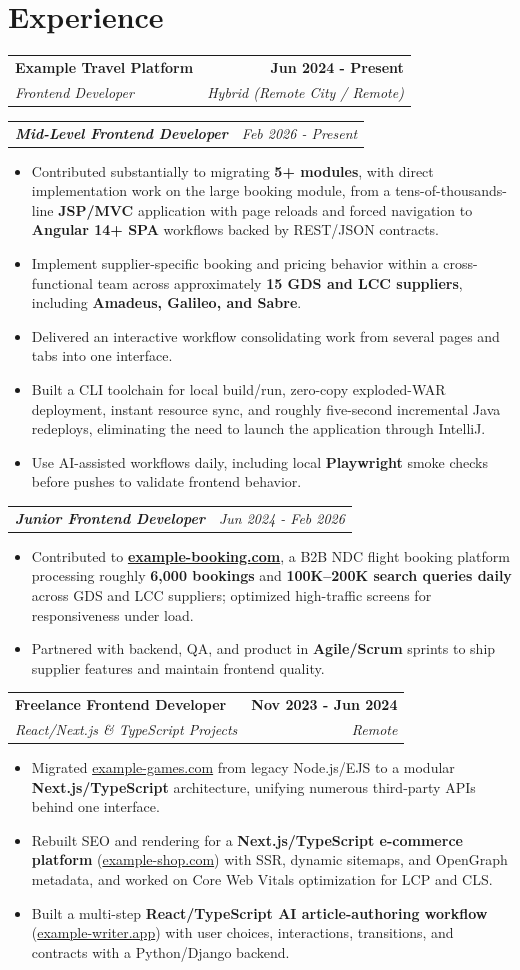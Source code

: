 \documentclass[letterpaper,10pt]{article}
\makeatletter
\newlength{\cvEmployerToRoleAdjust}
\newlength{\cvRoleGap}
\newlength{\cvEmployerGap}
\newcommand{\resumeEmployerHeading}[4]{%
  \noindent
  \begin{tabularx}{\textwidth}{@{}Xr@{}}
    \textbf{#1} & \textbf{#2} \\
    \textit{#3} & \textit{#4} \\
  \end{tabularx}\par
}
\newcommand{\resumeRole}[2]{%
  \noindent
  \begin{tabularx}{\textwidth}{@{}Xr@{}}
    \textbf{\textit{#1}} & \textit{#2} \\
  \end{tabularx}\par
}
\newcommand{\resumeItem}[1]{\item #1}
\newcommand{\resumeItemListStart}{%
  \begin{itemize}[
    leftmargin=1.15em,
    label=\textbullet,
    labelsep=0.45em,
    itemsep=1pt,
    parsep=0pt,
    partopsep=0pt,
    topsep=1pt
  ]
}
\newcommand{\resumeItemListEnd}{\end{itemize}}
\makeatother
\begin{document}
\section{Experience}
\resumeEmployerHeading
  {Example Travel Platform}{Jun 2024 - Present}
  {Frontend Developer}{Hybrid (Remote City / Remote)}
\vspace{\cvEmployerToRoleAdjust}
\resumeRole{Mid-Level Frontend Developer}{Feb 2026 - Present}
\resumeItemListStart
  \resumeItem{Contributed substantially to migrating \textbf{5+ modules}, with direct implementation work on the large booking module, from a tens-of-thousands-line \textbf{JSP/MVC} application with page reloads and forced navigation to \textbf{Angular 14+ SPA} workflows backed by REST/JSON contracts.}
  \resumeItem{Implement supplier-specific booking and pricing behavior within a cross-functional team across approximately \textbf{15 GDS and LCC suppliers}, including \textbf{Amadeus, Galileo, and Sabre}.}
  \resumeItem{Delivered an interactive workflow consolidating work from several pages and tabs into one interface.}
  \resumeItem{Built a CLI toolchain for local build/run, zero-copy exploded-WAR deployment, instant resource sync, and roughly five-second incremental Java redeploys, eliminating the need to launch the application through IntelliJ.}
  \resumeItem{Use AI-assisted workflows daily, including local \textbf{Playwright} smoke checks before pushes to validate frontend behavior.}
\resumeItemListEnd
\vspace{\cvRoleGap}
\resumeRole{Junior Frontend Developer}{Jun 2024 - Feb 2026}
\resumeItemListStart
  \resumeItem{Contributed to \textbf{\href{https://example-booking.com}{example-booking.com}}, a B2B NDC flight booking platform processing roughly \textbf{6,000 bookings} and \textbf{100K--200K search queries daily} across GDS and LCC suppliers; optimized high-traffic screens for responsiveness under load.}
  \resumeItem{Partnered with backend, QA, and product in \textbf{Agile/Scrum} sprints to ship supplier features and maintain frontend quality.}
\resumeItemListEnd
\vspace{\cvEmployerGap}
\resumeEmployerHeading
  {Freelance Frontend Developer}{Nov 2023 - Jun 2024}
  {React/Next.js \& TypeScript Projects}{Remote}
\resumeItemListStart
  \resumeItem{Migrated \href{https://example-games.com/ar}{example-games.com} from legacy Node.js/EJS to a modular \textbf{Next.js/TypeScript} architecture, unifying numerous third-party APIs behind one interface.}
  \resumeItem{Rebuilt SEO and rendering for a \textbf{Next.js/TypeScript e-commerce platform} (\href{https://www.example-shop.com/ar/login}{example-shop.com}) with SSR, dynamic sitemaps, and OpenGraph metadata, and worked on Core Web Vitals optimization for LCP and CLS.}
  \resumeItem{Built a multi-step \textbf{React/TypeScript AI article-authoring workflow} (\href{https://example-writer.app/home}{example-writer.app}) with user choices, interactions, transitions, and contracts with a Python/Django backend.}
\resumeItemListEnd
\end{document}
